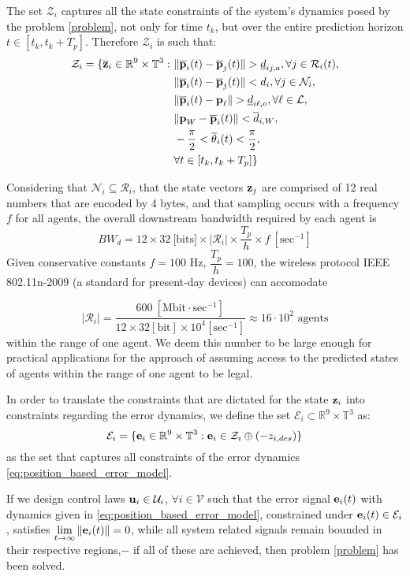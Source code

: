 The set $\mathcal{Z}_i$ captures all the state constraints of the system's
dynamics posed by the problem \eqref{problem}, not only for time $t_k$, but
over the entire prediction horizon $t \in [t_k, t_k + T_p]$.
Therefore $\mathcal{Z}_i$ is such that:
\begin{align}
  \mathcal{Z}_i = \{\overline{\bm{\mathbf{z}}}_i \in \mathbb{R}^{9}\times \mathbb{T}^3 : \
      & \|\overline{\bm{\mathbf{p}}}_i(t) - \overline{\bm{\mathbf{p}}}_j(t)\| > \underline{d}_{ij,a}, \forall j \in \mathcal{R}_i(t), \label{constraint:p_1}\\
      & \|\overline{\bm{\mathbf{p}}}_i(t) - \overline{\bm{\mathbf{p}}}_j(t)\| < d_i, \forall j \in \mathcal{N}_i, \\
      & \|\overline{\bm{\mathbf{p}}}_i(t) - \bm{\mathbf{p}}_{\ell}\| > \underline{d}_{i\ell,o}, \forall \ell \in \mathcal{L}, \\
      & \|\bm{\mathbf{p}}_W - \overline{\bm{\mathbf{p}}}_i(t)\| < \overline{d}_{i,W}, \\
      & - \frac{\pi}{2} < \overline{\theta}_i(t) < \frac{\pi}{2} \label{constraint:p_5}, \\
  &\forall t \in [t_k, t_k + T_p]\}
\end{align}

\begin{gg_box}
Considering that $\mathcal{N}_i \subseteq \mathcal{R}_i$, that the state
vectors $\bm{\mathbf{z}}_j$ are comprised of 12 real numbers that are encoded by
4 bytes, and that sampling occurs with a frequency $f$ for all agents, the
overall downstream bandwidth required by each agent is
$$BW_d = 12 \times 32\ \text{[bits]} \times |\mathcal{R}_i| \times \dfrac{T_p}{h} \times f\ [\text{sec}^{-1}]$$
Given conservative constants $f = 100$ Hz, $\dfrac{T_p}{h} = 100$, the
wireless protocol IEEE 802.11n-2009 (a standard for present-day devices)
can accomodate

$$|\mathcal{R}_i| = \dfrac{600\ [\text{Mbit}\cdot \text{sec}^{-1}] }{12\times32[\text{bit}]\times10^4 [\text{sec}^{-1}]} \approx
16 \cdot 10^2 \text{ agents}$$ within the range of one agent.
We deem this number to be large enough for practical applications
for the approach of assuming access to the predicted states of agents
within the range of one agent to be legal.
\end{gg_box}

In order to translate
the constraints that are dictated for the state $\bm{\mathbf{z}}_i$ into constraints
regarding the error dynamics, we define the set
$\mathcal{E}_i \subset \mathbb{R}^9 \times \mathbb{T}^3$ as:
$$\mathcal{E}_i = \{\bm{\mathbf{e}}_i \in \mathbb{R}^9 \times \mathbb{T}^3 :
\bm{\mathbf{e}}_i \in \mathcal{Z}_i \oplus (-z_{i,des} )\}$$
as the set that captures all constraints of the error dynamics
\eqref{eq:position_based_error_model}.

If we design control laws $\bm{\mathbf{u}}_i \in \mathcal{U}_i$,
$\forall i \in \mathcal{V}$ such that the error signal $\bm{\mathbf{e}}_i(t)$ with
dynamics given in \eqref{eq:position_based_error_model}, constrained under
$\bm{\mathbf{e}}_i(t) \in \mathcal{E}_i$, satisfies
$\lim\limits_{t \to \infty} \|\bm{\mathbf{e}}_i(t)\| = 0$, while all system related
signals remain bounded in their respective regions,$-$ if all of these are
achieved, then problem \eqref{problem} has been solved.

